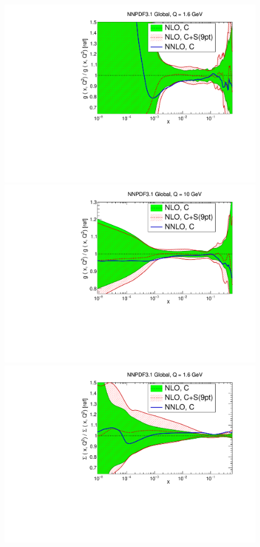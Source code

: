 \begin{figure}[H]
  \begin{center}
       \includegraphics[scale=0.35]{mhous/plots/xg-Global-NLO-CovMatTH-EXP-vsTH16.pdf}
    \includegraphics[scale=0.35]{mhous/plots/xg-Global-NLO-CovMatTH-EXP-vsTH.pdf}
         \includegraphics[scale=0.35]{mhous/plots/xsinglet-Global-NLO-CovMatTH-EXP-vsTH16.pdf}

\end{center}
\end{figure}
